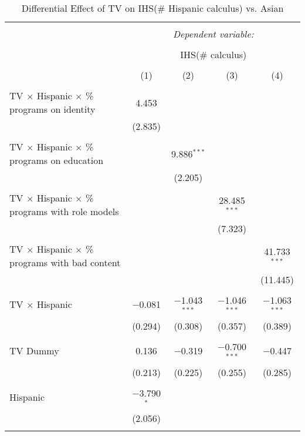 
\begin{table}[!htbp] \centering 
  \caption{Differential Effect of TV on IHS(\# Hispanic calculus) vs. Asian} 
  \label{} 
\begin{tabular}{@{\extracolsep{-2pt}}lcccc} 
\\[-1.8ex]\hline 
\hline \\[-1.8ex] 
 & \multicolumn{4}{c}{\textit{Dependent variable:}} \\ 
\cline{2-5} 
\\[-1.8ex] & \multicolumn{4}{c}{IHS(\# calculus)} \\ 
\\[-1.8ex] & (1) & (2) & (3) & (4)\\ 
\hline \\[-1.8ex] 
 TV $\times$ Hispanic $\times$ \% programs on identity & 4.453 &  &  &  \\ 
  & (2.835) &  &  &  \\ 
  & & & & \\ 
 TV $\times$ Hispanic $\times$ \% programs on education &  & 9.886$^{***}$ &  &  \\ 
  &  & (2.205) &  &  \\ 
  & & & & \\ 
 TV $\times$ Hispanic $\times$ \% programs with role models &  &  & 28.485$^{***}$ &  \\ 
  &  &  & (7.323) &  \\ 
  & & & & \\ 
 TV $\times$ Hispanic $\times$ \% programs with bad content &  &  &  & 41.733$^{***}$ \\ 
  &  &  &  & (11.445) \\ 
  & & & & \\ 
 TV $\times$ Hispanic & $-$0.081 & $-$1.043$^{***}$ & $-$1.046$^{***}$ & $-$1.063$^{***}$ \\ 
  & (0.294) & (0.308) & (0.357) & (0.389) \\ 
  & & & & \\ 
 TV Dummy & 0.136 & $-$0.319 & $-$0.700$^{***}$ & $-$0.447 \\ 
  & (0.213) & (0.225) & (0.255) & (0.285) \\ 
  & & & & \\ 
 Hispanic & $-$3.790$^{*}$ &  &  &  \\ 
  & (2.056) &  &  &  \\ 
  & & & & \\ 

\end{tabular}
\end{table}
